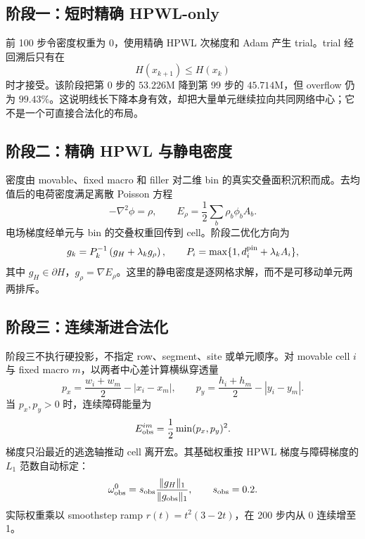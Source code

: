 \documentclass[11pt,a4paper]{ctexart}
\begin{document}
\subsection{阶段一：短时精确 HPWL-only}

前 100 步令密度权重为 0，使用精确 HPWL 次梯度和 Adam 产生 trial。trial 经回溯后只有在
\begin{equation}
H(x_{k+1})\leq H(x_k)
\end{equation}
时才接受。该阶段把第 0 步的 $53.226$M 降到第 99 步的 $45.714$M，但 overflow 仍为 $99.43\%$。这说明线长下降本身有效，却把大量单元继续拉向共同网络中心；它不是一个可直接合法化的布局。

\subsection{阶段二：精确 HPWL 与静电密度}

密度由 movable、fixed macro 和 filler 对二维 bin 的真实交叠面积沉积而成。去均值后的电荷密度满足离散 Poisson 方程
\begin{equation}
-\nabla^2\phi=\rho,\qquad
E_\rho=\frac12\sum_b \rho_b\phi_b A_b.
\end{equation}
电场梯度经单元与 bin 的交叠权重回传到 cell。阶段二优化方向为
\begin{equation}
g_k=P_k^{-1}\left(g_H+\lambda_k g_\rho\right),\qquad
P_i=\max\{1,d_i^{\rm pin}+\lambda_k A_i\},
\label{eq:preconditioned}
\end{equation}
其中 $g_H\in\partial H$，$g_\rho=\nabla E_\rho$。这里的静电密度是逐网格求解，而不是可移动单元两两排斥。

\subsection{阶段三：连续渐进合法化}

阶段三不执行硬投影，不指定 row、segment、site 或单元顺序。对 movable cell $i$ 与 fixed macro $m$，以两者中心差计算横纵穿透量
\begin{equation}
p_x=\frac{w_i+w_m}{2}-|x_i-x_m|,\qquad
p_y=\frac{h_i+h_m}{2}-|y_i-y_m|.
\end{equation}
当 $p_x,p_y>0$ 时，连续障碍能量为
\begin{equation}
E_{\rm obs}^{im}=\frac12\min(p_x,p_y)^2.
\label{eq:obstacle}
\end{equation}
梯度只沿最近的逃逸轴推动 cell 离开宏。其基础权重按 HPWL 梯度与障碍梯度的 $L_1$ 范数自动标定：
\begin{equation}
\omega_{\rm obs}^{0}=s_{\rm obs}
\frac{\|g_H\|_1}{\|g_{\rm obs}\|_1},\qquad s_{\rm obs}=0.2.
\end{equation}
实际权重乘以 smoothstep ramp $r(t)=t^2(3-2t)$，在 200 步内从 0 连续增至 1。
\end{document}
